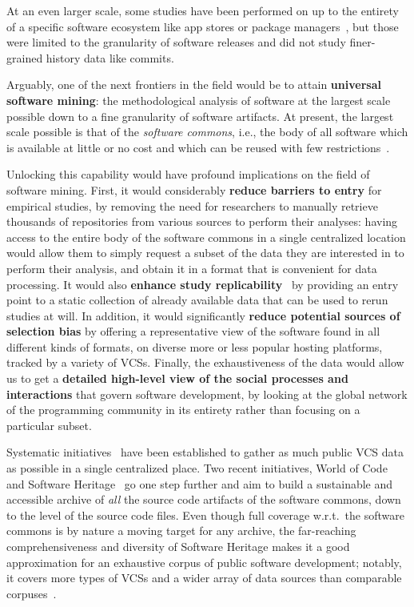 At an even larger scale, some studies have been performed on up to the entirety
of a specific software ecosystem like app stores or package
managers~\cite{gonzalez2009macro,debsources-ese-2016}, but those were limited
to the granularity of software releases and did not study finer-grained history
data like commits.

Arguably, one of the next frontiers in the field would be to attain
\textbf{universal software mining}: the methodological analysis of software at
the largest scale possible down to a fine granularity of software artifacts.
At present, the largest scale possible is that of the \emph{software commons},
i.e., the body of all software which is available at little or no cost and
which can be reused with few
restrictions~\cite{1999-beagle-in-commons,kranich2008information}.

Unlocking this capability would have profound implications on the field of
software mining. First, it would considerably \textbf{reduce barriers to entry}
for empirical studies, by removing the need for researchers to manually
retrieve thousands of repositories from various sources to perform their
analyses: having access to the entire body of the software commons in a single
centralized location would allow them to simply request a subset of the data
they are interested in to perform their analysis, and obtain it in a format
that is convenient for data processing. It would also \textbf{enhance study
replicability}~\cite{Collberg2016,the-real-software-crisis,ferro2018sigir} by
providing an entry point to a static collection of already available data that
can be used to rerun studies at will.  In addition, it would significantly
\textbf{reduce potential sources of selection bias} by offering a
representative view of the software found in all different kinds of formats, on
diverse more or less popular hosting platforms, tracked by a variety of
\glspl{VCS}.  Finally, the exhaustiveness of the data would allow us to get a
\textbf{detailed high-level view of the social processes and interactions} that
govern software development, by looking at the global network of the
programming community in its entirety rather than focusing on a particular
subset.

Systematic initiatives~\cite{flossmole2006,gao2007archive,mockus2009}
have been established to gather as much public \gls{VCS} data as possible in a
single centralized place. Two recent initiatives, World of
Code~\cite{mockus2019woc} and Software Heritage~\cite{swhipres2017,
swhcacm2018} go one step further and aim to build a sustainable and accessible
archive of \emph{all} the source code artifacts of the software commons, down
to the level of the source code files. Even though full coverage w.r.t.\ the
software commons is by nature a moving target for any archive, the far-reaching
comprehensiveness and diversity of Software Heritage makes it a good
approximation for an exhaustive corpus of public software development; notably,
it covers more types of \glspl{VCS} and a wider array of data sources than
comparable corpuses~\cite{ma2021world}.

